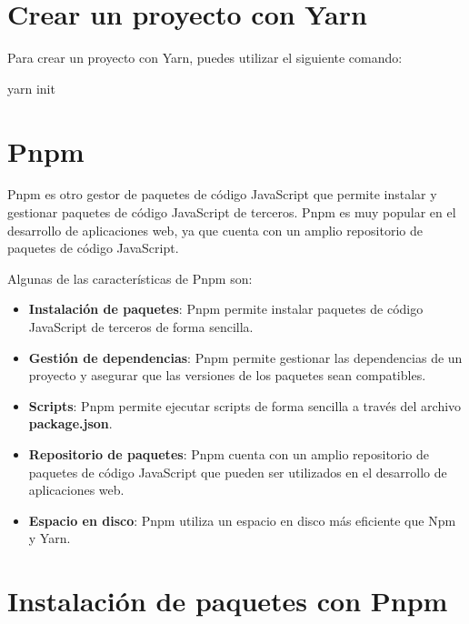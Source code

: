\documentclass[
  a4paper,
  DIV=11,
  numbers=noendperiod,
  onepage,
  openany]{scrreprt}
\newenvironment{Shaded}{\begin{snugshade}}{\end{snugshade}}
\newcommand{\ExtensionTok}[1]{\textcolor[rgb]{0.00,0.23,0.31}{#1}}
\newcommand{\NormalTok}[1]{\textcolor[rgb]{0.00,0.23,0.31}{#1}}
\begin{document}
\section{Crear un proyecto con Yarn}\label{crear-un-proyecto-con-yarn}

Para crear un proyecto con Yarn, puedes utilizar el siguiente comando:

\begin{Shaded}
\begin{Highlighting}[]
\ExtensionTok{yarn}\NormalTok{ init}
\end{Highlighting}
\end{Shaded}

\section{Pnpm}\label{pnpm}

Pnpm es otro gestor de paquetes de código JavaScript que permite
instalar y gestionar paquetes de código JavaScript de terceros. Pnpm es
muy popular en el desarrollo de aplicaciones web, ya que cuenta con un
amplio repositorio de paquetes de código JavaScript.

Algunas de las características de Pnpm son:

\begin{itemize}
\item
  \textbf{Instalación de paquetes}: Pnpm permite instalar paquetes de
  código JavaScript de terceros de forma sencilla.
\item
  \textbf{Gestión de dependencias}: Pnpm permite gestionar las
  dependencias de un proyecto y asegurar que las versiones de los
  paquetes sean compatibles.
\item
  \textbf{Scripts}: Pnpm permite ejecutar scripts de forma sencilla a
  través del archivo \textbf{package.json}.
\item
  \textbf{Repositorio de paquetes}: Pnpm cuenta con un amplio
  repositorio de paquetes de código JavaScript que pueden ser utilizados
  en el desarrollo de aplicaciones web.
\item
  \textbf{Espacio en disco}: Pnpm utiliza un espacio en disco más
  eficiente que Npm y Yarn.
\end{itemize}

\section{Instalación de paquetes con
Pnpm}\label{instalaciuxf3n-de-paquetes-con-pnpm}
\end{document}
